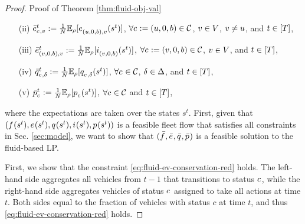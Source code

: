 \begin{proof}{Proof of Theorem \ref{thm:fluid-obj-val}}
\begin{enumerate}
        \item[(ii)] $\lpreroute{\cartype{}, \region}{t} := \frac{1}{\Size} \mathbb{E}_{\rho}[\jointreroutingaction{(\origin, 0, \battery), \region}{}(s^t)]$, $\forall \cartype{} := (\origin, 0, \battery) \in \Cartype$, $\region \in \Region$, $\region \neq \origin$, and $\time \in [\Horizon]$,
        \item[(iii)] $\lpreroute{(\region, 0, \battery), \region}{t} := \frac{1}{\Size} \mathbb{E}_{\rho}[\jointidlingaction{(\region, 0, \battery)}{}(s^t)]$, $\forall \cartype{} := (\region, 0, \battery) \in \Cartype$, $\region \in \Region$, and $\time \in [\Horizon]$,
        \item[(iv)] $\lpcharge{\cartype{}, \type}{t} := \frac{1}{\Size} \mathbb{E}_{\rho}[\jointchargingaction{\cartype{}, \type}{}(s^t)]$, $\forall \cartype{} \in \Cartype$, $\type \in \Type$, and $\time \in [\Horizon]$,
        \item[(v)] $\lppass{\cartype{}}{t} := \frac{1}{\Size} \mathbb{E}_{\rho}[\jointpassaction{\cartype{}}{}(s^t)]$, $\forall \cartype{} \in \Cartype$ and $\time \in [\Horizon]$,
    \end{enumerate}
    where the expectations are taken over the states $s^t$. First, given that $(\jointtripfulfillaction{}{}(s^t), \jointreroutingaction{}{}(s^t), \jointchargingaction{}{}(s^t), \jointidlingaction{}{}(s^t), \jointpassaction{}{}(s^t))$ is a feasible fleet flow that satisfies all constraints in Sec. \ref{sec:model}, we want to show that $(\lptripfulfill{}{}, \lpreroute{}{}, \lpcharge{}{}, \lppass{}{})$ is a feasible solution to the fluid-based LP.

    First, we show that the constraint \eqref{eq:fluid-ev-conservation-red} holds. The left-hand side aggregates all vehicles from $t-1$ that transitions to status $\cartype{}$, while the right-hand side aggregates vehicles of status $\cartype{}$ assigned to take all actions at time $t$. Both sides equal to the fraction of vehicles with status $c$ at time $t$, and thus \eqref{eq:fluid-ev-conservation-red} holds.


\end{proof}
